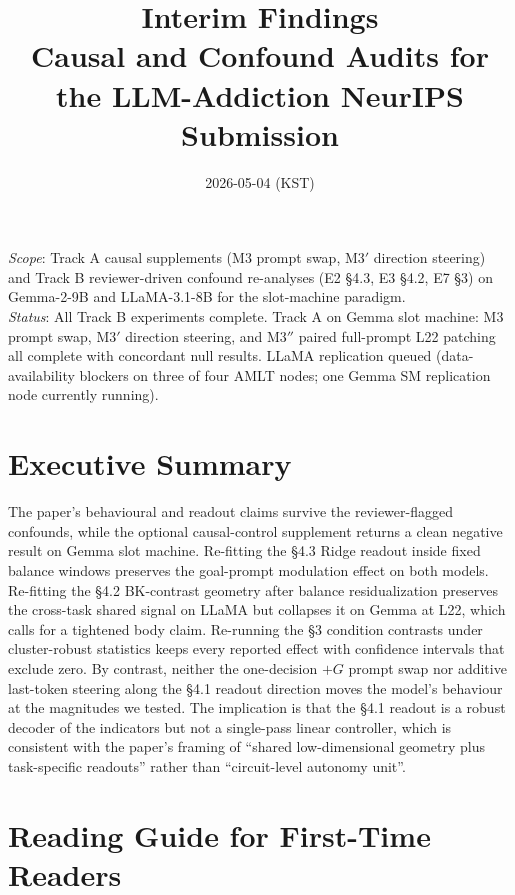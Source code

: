\documentclass[11pt,a4paper]{article}
\title{\textbf{Interim Findings} \\
\large Causal and Confound Audits for the LLM-Addiction NeurIPS Submission}
\author{}
\date{2026-05-04 (KST)}
\begin{document}
\maketitle

\textit{Scope}: Track A causal supplements (M3 prompt swap, M3$'$ direction steering) and Track B reviewer-driven confound re-analyses (E2 \S4.3, E3 \S4.2, E7 \S3) on Gemma-2-9B and LLaMA-3.1-8B for the slot-machine paradigm. \\
\textit{Status}: All Track B experiments complete. Track A on Gemma slot machine: M3 prompt swap, M3$'$ direction steering, and M3$''$ paired full-prompt L22 patching all complete with concordant null results. LLaMA replication queued (data-availability blockers on three of four AMLT nodes; one Gemma SM replication node currently running).

\section*{Executive Summary}

The paper's behavioural and readout claims survive the reviewer-flagged confounds, while the optional causal-control supplement returns a clean negative result on Gemma slot machine. Re-fitting the \S4.3 Ridge readout inside fixed balance windows preserves the goal-prompt modulation effect on both models. Re-fitting the \S4.2 BK-contrast geometry after balance residualization preserves the cross-task shared signal on LLaMA but collapses it on Gemma at L22, which calls for a tightened body claim. Re-running the \S3 condition contrasts under cluster-robust statistics keeps every reported effect with confidence intervals that exclude zero. By contrast, neither the one-decision $+G$ prompt swap nor additive last-token steering along the \S4.1 readout direction moves the model's behaviour at the magnitudes we tested. The implication is that the \S4.1 readout is a robust decoder of the indicators but not a single-pass linear controller, which is consistent with the paper's framing of ``shared low-dimensional geometry plus task-specific readouts'' rather than ``circuit-level autonomy unit''.

\section*{Reading Guide for First-Time Readers}
\end{document}
